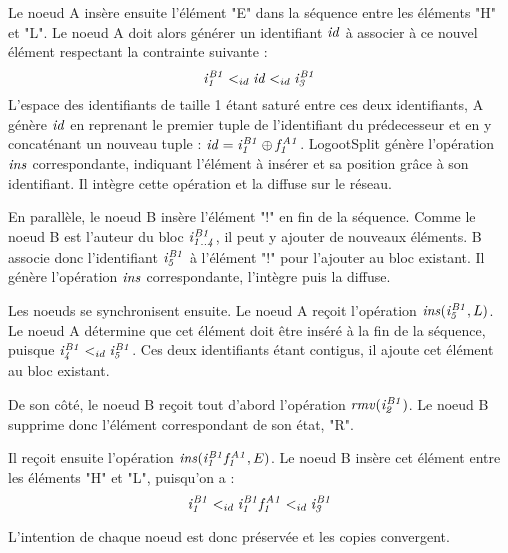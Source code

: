 Le noeud A insère ensuite l'élément "E" dans la séquence entre les éléments "H" et "L".
Le noeud A doit alors générer un identifiant $\mathit{id}$ à associer à ce nouvel élément respectant la contrainte suivante :
\begin{equation*}
  \mathit{i}^{\mathit{B1}}_{\mathit{1}} <_{id} \mathit{id} <_{id} \mathit{i}^{\mathit{B1}}_{\mathit{3}}
\end{equation*}
L'espace des identifiants de taille 1 étant saturé entre ces deux identifiants, A génère $\mathit{id}$ en reprenant le premier tuple de l'identifiant du prédecesseur et en y concaténant un nouveau tuple : $\mathit{id} = \mathit{i}^{\mathit{B1}}_{\mathit{1}} \oplus \mathit{f}^{\mathit{A1}}_{\mathit{1}}$.
LogootSplit génère l'opération $\mathit{ins}$ correspondante, indiquant l'élément à insérer et sa position grâce à son identifiant.
Il intègre cette opération et la diffuse sur le réseau.

En parallèle, le noeud B insère l'élément "!" en fin de la séquence.
Comme le noeud B est l'auteur du bloc $\mathit{i}^{\mathit{B1}}_{\mathit{1..4}}$, il peut y ajouter de nouveaux éléments.
B associe donc l'identifiant $\mathit{i}^{\mathit{B1}}_{\mathit{5}}$ à l'élément "!" pour l'ajouter au bloc existant.
Il génère l'opération $\mathit{ins}$ correspondante, l'intègre puis la diffuse.

Les noeuds se synchronisent ensuite.
Le noeud A reçoit l'opération $\mathit{ins}(\mathit{i}^{\mathit{B1}}_{\mathit{5}},L)$.
Le noeud A détermine que cet élément doit être inséré à la fin de la séquence, puisque $\mathit{i}^{\mathit{B1}}_{\mathit{4}} <_{id} \mathit{i}^{\mathit{B1}}_{\mathit{5}}$.
Ces deux identifiants étant contigus, il ajoute cet élément au bloc existant.

De son côté, le noeud B reçoit tout d'abord l'opération $\mathit{rmv}(\mathit{i}^{\mathit{B1}}_{\mathit{2}})$.
Le noeud B supprime donc l'élément correspondant de son état, "R".

Il reçoit ensuite l'opération $\mathit{ins}(\mathit{i}^{\mathit{B1}}_{\mathit{1}}\mathit{f}^{\mathit{A1}}_{\mathit{1}},E)$.
Le noeud B insère cet élément entre les éléments "H" et "L", puisqu'on a :
\begin{equation*}
  \mathit{i}^{\mathit{B1}}_{\mathit{1}} <_{id} \mathit{i}^{\mathit{B1}}_{\mathit{1}}\mathit{f}^{\mathit{A1}}_{\mathit{1}} <_{id} \mathit{i}^{\mathit{B1}}_{\mathit{3}}
\end{equation*}

L'intention de chaque noeud est donc préservée et les copies convergent.
